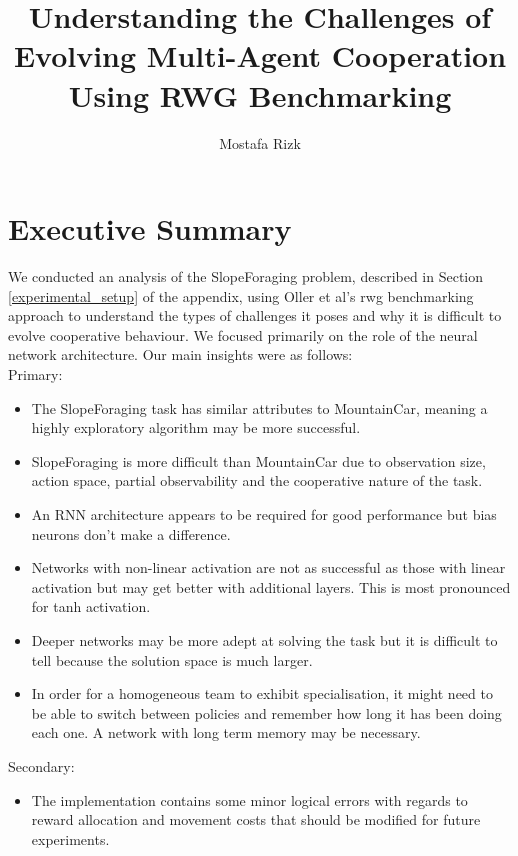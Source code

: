 \documentclass[12pt]{article}
\title{Understanding the Challenges of Evolving Multi-Agent Cooperation Using RWG Benchmarking}
\author{Mostafa Rizk}
\begin{document}
\maketitle
\tableofcontents

\section{Executive Summary}

We conducted an analysis of the SlopeForaging problem, described in Section \ref{experimental_setup} of the appendix, using Oller et al's rwg benchmarking approach \cite{oller:AAMAS:2020} to understand the types of challenges it poses and why it is difficult to evolve cooperative behaviour. 
We focused primarily on the role of the neural network architecture.
Our main insights were as follows:\\

Primary:
\begin{itemize}
\item The SlopeForaging task has similar attributes to MountainCar, meaning a highly exploratory algorithm may be more successful.

\item SlopeForaging is more difficult than MountainCar due to observation size, action space, partial observability and the cooperative nature of the task. 

\item An RNN architecture appears to be required for good performance but bias neurons don't make a difference.

\item Networks with non-linear activation are not as successful as those with linear activation but may get better with additional layers. 
This is most pronounced for tanh activation.

\item Deeper networks may be more adept at solving the task but it is difficult to tell because the solution space is much larger.

\item In order for a homogeneous team to exhibit specialisation, it might need to be able to switch between policies and remember how long it has been doing each one.
A network with long term memory may be necessary.

\end{itemize}

Secondary:
\begin{itemize}

\item The implementation contains some minor logical errors with regards to reward allocation and movement costs that should be modified for future experiments.
\end{itemize}
\end{document}
